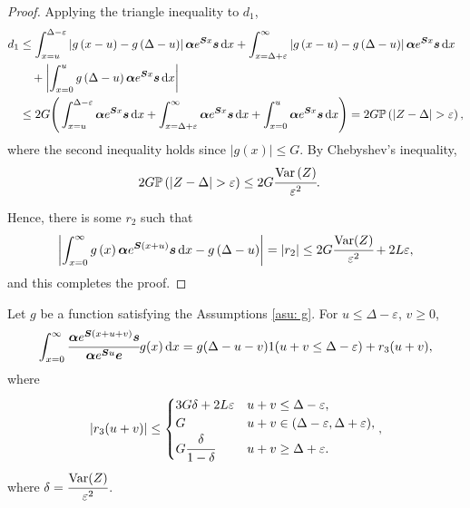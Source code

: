 \begin{proof}
 	Applying the triangle inequality to \(d_1\),
	\begin{align*}
		d_1  &\leq \int_{x=u}^{\Delta-\varepsilon } \left|g\left(x-u\right)- g\left(\Delta-u\right)\right|\bs \alpha  e^{\bs{S} x} \bs s \wrt x
		+ \int_{x=\Delta+\varepsilon }^{\infty} \left|g\left(x-u\right)- g\left(\Delta-u\right)\right|\bs \alpha  e^{\bs{S} x} \bs s \wrt x \nonumber
		\\&\quad{}+ \left|\int_{x=0}^u g\left(\Delta-u\right)\bs \alpha  e^{\bs{S} x} \bs s \wrt x \right| 
		\\& \leq 2G\Bigg( \int_{x=u}^{\Delta-\varepsilon }\bs \alpha  e^{\bs{S} x} \bs s \wrt x
		+ \int_{x=\Delta+\varepsilon }^{\infty}\bs \alpha  e^{\bs{S} x} \bs s \wrt x
		+ \int_{x=0}^u \bs \alpha  e^{\bs{S} x} \bs s \wrt x \Bigg)
		=2G\mathbb P\left(|Z -\Delta|>\varepsilon \right),
	\end{align*}
	where the second inequality holds since \(|g\left(x\right)|\leq G\).
	By Chebyshev's inequality, 
	\begin{align}
		&2G\mathbb P\left(|Z -\Delta|>\varepsilon \right)\leq 2G\cfrac{\var \left(Z \right)}{\varepsilon ^2}.
	\end{align}
	
	Hence, there is some \(r_2\) such that 
	\[\left|\int_{x=0}^\infty g\left(x\right)\boldsymbol \alpha  e^{\boldsymbol{S} \left(x+u\right)} \boldsymbol s \, \mathrm{d} x - g\left(\Delta-u\right)\right| = |r_2| \leq 2G\cfrac{\mathrm{Var}(Z)}{\varepsilon^2} + 2 L \varepsilon,\]
	and this completes the proof. 
\end{proof}
\begin{cor}\label{cor: cond bnd 2}
	Let \(g\) be a function satisfying the Assumptions \ref{asu: g}. For \(u\leq \Delta-\varepsilon \), \(v\geq 0\), 
	\begin{align}
		\int_{x=0}^\infty \cfrac{\boldsymbol \alpha  e^{\boldsymbol{S} (x+u+v)} \boldsymbol s}{\boldsymbol \alpha  e^{\boldsymbol{S} u} \boldsymbol e} g(x)\, \mathrm{d} x = g(\Delta-u-v) 1(u+v\leq\Delta-\varepsilon) + r_3 (u+v),\label{eqn: ssss}
	\end{align}
	where 
	\[\left|r_3 (u+v)\right|\leq \begin{cases} 
		3G\delta + 2L\varepsilon & u+v\leq \Delta-\varepsilon,\\
		G & u+v\in(\Delta-\varepsilon,\Delta+\varepsilon), \\
		G\cfrac{\delta}{1-\delta} & u+v \geq \Delta + \varepsilon.
		\end{cases},\]
	where \(\delta = \cfrac{\mathrm{Var}(Z)}{\varepsilon^2}\). 
\end{cor}
